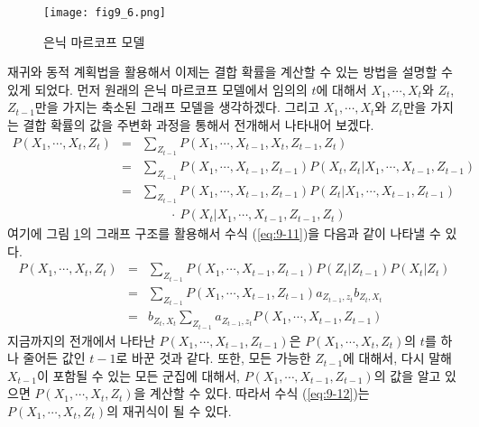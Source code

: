 \documentclass[a4paper]{oblivoir}
\begin{document}
\begin{figure}[ht] \centering 
\texttt{[image: fig9\_6.png]} 
\caption{은닉 마르코프 모델}
\label{fig:9-13}
\end{figure}

재귀와 동적 계획법을 활용해서 이제는 결합 확률을 계산할 수 있는 방법을 설명할 수 있게 되었다. 먼저 원래의 은닉 마르코프 모델에서 임의의  $t$에 대해서 $X_{1},\cdots,X_{t}$와 $Z_{t}$, $Z_{t-1}$만을 가지는 축소된 그래프 모델을 생각하겠다. 그리고 $X_{1},\cdots,X_{t}$와 $Z_{t}$만을 가지는 결합 확률의 값을 주변화 과정을 통해서 전개해서 나타내어 보겠다. 
\begin{eqnarray}
P(X_{1},\cdots,X_{t},Z_{t}) & = & \sum_{Z_{t-1}} P(X_{1},\cdots,X_{t-1},X_{t},Z_{t-1},Z_{t}) \nonumber \\
& = & \sum_{Z_{t-1}} P(X_{1},\cdots,X_{t-1},Z_{t-1}) P(X_{t},Z_{t}|X_{1},\cdots,X_{t-1},Z_{t-1})  \nonumber \\
& = & \sum_{Z_{t-1}} P(X_{1},\cdots,X_{t-1},Z_{t-1}) P(Z_{t}|X_{1},\cdots,X_{t-1},Z_{t-1}) \nonumber \\ 
&  &  \ \ \ \ \ \ \ \ \ \ \cdot \ P(X_{t} | X_{1},\cdots,X_{t-1},Z_{t-1},Z_{t})  \label{eq:9-11}
\end{eqnarray}
여기에 그림 \ref{fig:9-13}의 그래프 구조를 활용해서 수식 (\ref{eq:9-11})을 다음과 같이 나타낼 수 있다. 
\begin{eqnarray}
P(X_{1},\cdots,X_{t},Z_{t}) & = & \sum_{Z_{t-1}} P(X_{1},\cdots,X_{t-1},Z_{t-1}) P(Z_{t}|Z_{t-1}) P(X_{t} | Z_{t}) \nonumber \\ 
& = & \sum_{Z_{t-1}} P(X_{1},\cdots,X_{t-1},Z_{t-1}) a_{Z_{t-1},z_{t}} b_{Z_{t},X_{t}} \nonumber \\
& = & b_{Z_{t},X_{t}} \sum_{Z_{t-1}} a_{Z_{t-1},z_{t}} P(X_{1},\cdots,X_{t-1},Z_{t-1}) \label{eq:9-12}
\end{eqnarray}
지금까지의 전개에서 나타난 $P(X_{1},\cdots,X_{t-1},Z_{t-1})$은 $P(X_{1},\cdots,X_{t},Z_{t})$의 $t$를 하나 줄어든 값인 $t-1$로 바꾼 것과 같다. 또한, 모든 가능한 $Z_{t-1}$에 대해서, 다시 말해 $X_{t-1}$이 포함될 수 있는 모든 군집에 대해서, $P(X_{1},\cdots,X_{t-1},Z_{t-1})$의 값을 알고 있으면 $P(X_{1},\cdots,X_{t},Z_{t})$을 계산할 수 있다. 따라서 수식 (\ref{eq:9-12})는 $P(X_{1},\cdots,X_{t},Z_{t})$의 재귀식이 될 수 있다. \\
\end{document}
